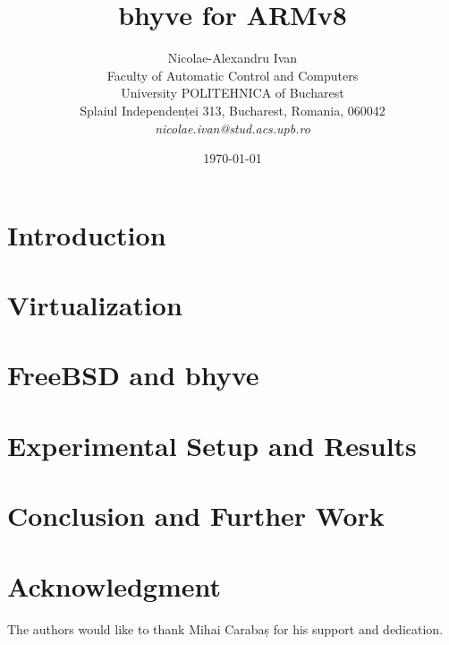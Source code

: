 \documentclass[12pt]{article}
\title{bhyve for ARMv8}
\author{Nicolae-Alexandru Ivan\\
Faculty of Automatic Control and Computers\\
University POLITEHNICA of Bucharest\\
Splaiul Independenței 313, Bucharest, Romania, 060042 \\
\emph{nicolae.ivan@stud.acs.upb.ro}}
\date{\today}
\begin{document}
\maketitle

\begin{abstract}

\end{abstract}

\section{Introduction}
\label{sec:introduction}


\section{Virtualization}
\label{sec:virtualization}


\section{FreeBSD and bhyve}
\label{sec:bhyve}


\newpage

\section{Experimental Setup and Results}
\label{sec:setup}


\section{Conclusion and Further Work}
\label{sec:conclusion}


\section*{Acknowledgment}
\label{sec:acknowledgment}

The authors would like to thank Mihai Carabaș for his support and dedication.

\nocite{*}



\end{document}
